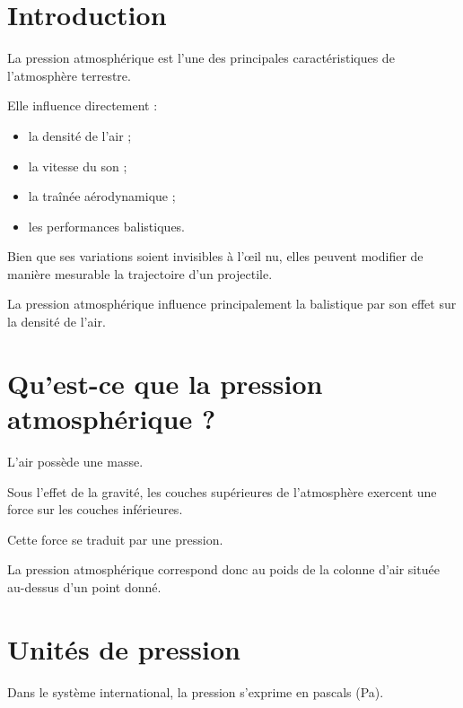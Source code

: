 
\section{Introduction}

La pression atmosphérique est l'une des principales caractéristiques de
l'atmosphère terrestre.

Elle influence directement :

\begin{itemize}
\item la densité de l'air ;
\item la vitesse du son ;
\item la traînée aérodynamique ;
\item les performances balistiques.
\end{itemize}

Bien que ses variations soient invisibles à l'œil nu, elles peuvent modifier
de manière mesurable la trajectoire d'un projectile.

\begin{aretenir}

La pression atmosphérique influence principalement la balistique par son effet
sur la densité de l'air.

\end{aretenir}

\section{Qu'est-ce que la pression atmosphérique ?}

L'air possède une masse.

Sous l'effet de la gravité, les couches supérieures de l'atmosphère exercent
une force sur les couches inférieures.

Cette force se traduit par une pression.

La pression atmosphérique correspond donc au poids de la colonne d'air située
au-dessus d'un point donné.

\section{Unités de pression}

Dans le système international, la pression s'exprime en pascals (Pa).

